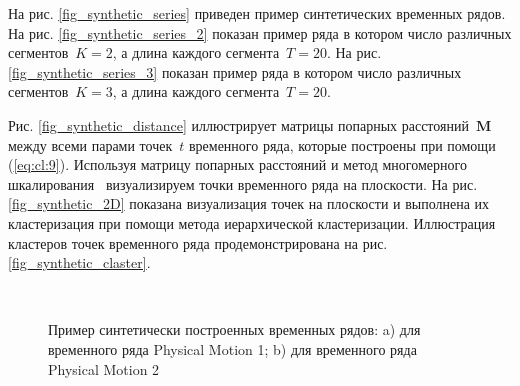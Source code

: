 На рис. \ref{fig_synthetic_series} приведен пример синтетических временных рядов. 
На рис. \ref{fig_synthetic_series_2} показан пример ряда в котором число различных сегментов~$K = 2$, а длина каждого сегмента~$T = 20$. 
На рис. \ref{fig_synthetic_series_3} показан пример ряда в котором число различных сегментов~$K = 3$, а длина каждого сегмента~$T = 20$. 

Рис. \ref{fig_synthetic_distance} иллюстрирует матрицы попарных расстояний~$\textbf{M}$ между всеми парами точек~$t$ временного ряда, которые построены при помощи (\ref{eq:cl:9}). 
Используя матрицу попарных расстояний и метод многомерного шкалирования~\cite{Borg2005} визуализируем точки временного ряда на плоскости. 
На рис. \ref{fig_synthetic_2D} показана визуализация точек на плоскости и выполнена их кластеризация при помощи метода иерархической кластеризации. 
Иллюстрация кластеров точек временного ряда продемонстрирована на рис. \ref{fig_synthetic_claster}.

\begin{figure}[h!t]\center
{}
\\
\caption{Пример синтетически построенных временных рядов: a) для временного ряда Physical Motion 1; b) для временного ряда Physical Motion 2}
\label{fig_real_series}
\end{figure}

